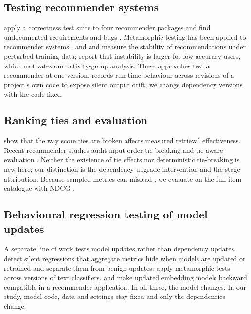 \documentclass[11pt,a4paper]{article}
\begin{document}
\subsection{Testing recommender systems}
\citet{michiels2024framework} apply a correctness test suite to four
recommender packages and find undocumented requirements and bugs
\citep[see also][]{recpacktests}. Metamorphic testing has
been applied to recommender systems \citep{mao2024metamorphic}, and
\citet{shriver2019fuzzing} and \citet{oh2022ranklist} measure the stability of
recommendations under perturbed training data; \citeauthor{oh2022ranklist}
report that instability is larger for low-accuracy users, which motivates our
activity-group analysis. These approaches test a recommender at one version.
\citet{kessel2026coversioning} records run-time behaviour across revisions of a
project's own code to expose silent output drift; we change dependency versions
with the code fixed.

\subsection{Ranking ties and evaluation}
\citet{lin2019ties} show that the way score ties are broken affects measured
retrieval effectiveness. Recent recommender studies audit input-order
tie-breaking and tie-aware evaluation \citep{guo2026ties,ma2026ties}. Neither
the existence of tie effects nor deterministic tie-breaking is new here; our
distinction is the dependency-upgrade intervention and the stage attribution.
Because sampled metrics can mislead \citep{krichene2020sampled}, we evaluate on
the full item catalogue with NDCG \citep{jarvelin2002cumulated}.

\subsection{Behavioural regression testing of model updates}
A separate line of work tests model updates rather than dependency updates.
\citet{pasupuleti2026behavioral} detect silent regressions that aggregate
metrics hide when models are updated or retrained and separate them from
benign updates. \citet{hossain2026alteron} apply metamorphic tests across
versions of text classifiers, and \citet{hu2022backward} make updated
embedding models backward compatible in a recommender application. In all
three, the model changes. In our study, model code, data and settings stay
fixed and only the dependencies change.

\end{document}
